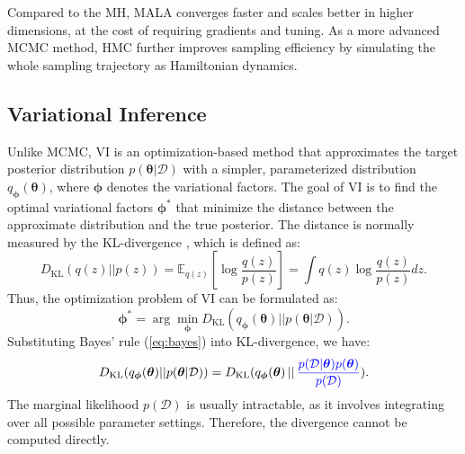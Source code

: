 Compared to the \ac{MH}, \ac{MALA} converges faster and scales better in higher dimensions, at the cost of requiring gradients and tuning. As a more advanced \ac{MCMC} method, \acf{HMC} \citep{duane1987hybrid} further improves sampling efficiency by simulating the whole sampling trajectory as Hamiltonian dynamics. 

\subsection{Variational Inference}
Unlike \ac{MCMC}, \acf{VI} \citep{Jordan1998, Wainwright2008} is an optimization-based method that approximates the target posterior distribution $p(\boldsymbol{\theta}|\mathcal{D})$ with a simpler, parameterized distribution $q_{\boldsymbol{\phi}}(\boldsymbol{\theta})$, where $\boldsymbol{\phi}$ denotes the variational factors. The goal of \ac{VI} is to find the optimal variational factors $\boldsymbol{\phi}^*$ that minimize the distance between the approximate distribution and the true posterior. The distance is normally measured by the \ac{KL}-divergence \citep{kl1951}, which is defined as:
\begin{equation}
    D_{\text{KL}}(q(z)||p(z)) = \mathbb{E}_{q(z)}[\log \frac{q(z)}{p(z)}] = \int q(z)\log \frac{q(z)}{p(z)}dz.
\end{equation}
Thus, the optimization problem of \ac{VI} can be formulated as:
\begin{equation}
    \boldsymbol{\phi}^* = \arg\min_{\boldsymbol{\phi}} D_{\text{KL}} (q_{\boldsymbol{\phi}}(\boldsymbol{\theta}) || p(\boldsymbol{\theta}|\mathcal{D})).
\end{equation}
Substituting Bayes' rule (\ref{eq:bayes}) into \ac{KL}-divergence, we have:
\begin{equation}
    D_{\text{KL}} (q_{\boldsymbol{\phi}}(\boldsymbol{\theta}) || p(\boldsymbol{\theta}|\mathcal{D})) = D_{\text{KL}} (q_{\boldsymbol{\phi}}(\boldsymbol{\theta}) \,||\, \textcolor{blue}{\frac{p(\mathcal{D}|\boldsymbol{\theta})p(\boldsymbol{\theta})}{p(\mathcal{D})}}).
\end{equation}
The marginal likelihood $p(\mathcal{D})$ is usually intractable, as it involves integrating over all possible parameter settings. Therefore, the divergence cannot be computed directly.

